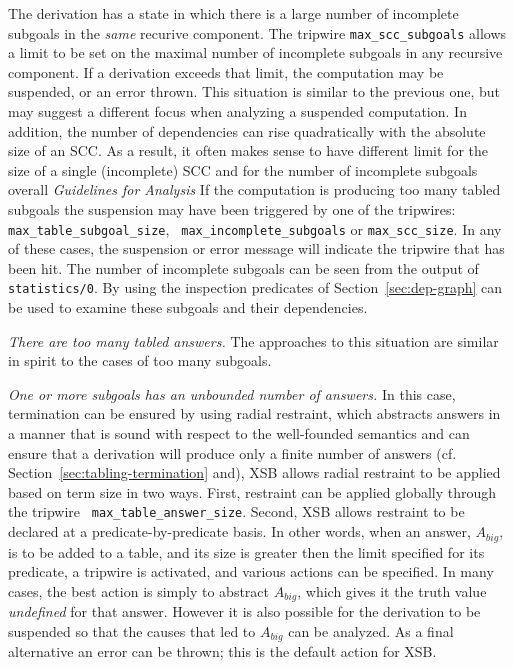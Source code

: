 \item The derivation has a state in which there is a large number of
 incomplete subgoals in the {\em same} recurive component.  The
 tripwire {\tt max\_scc\_subgoals} allows a limit to be set on the
 maximal number of incomplete subgoals in any recursive component.  If
 a derivation exceeds that limit, the computation may be suspended, or
 an error thrown.  This situation is similar to the previous one, but
 may suggest a different focus when analyzing a suspended computation.
  In addition, the number of dependencies can rise quadratically with
 the absolute size of an SCC.  As a result, it often makes sense to
 have different limit for the size of a single (incomplete) SCC and
 for the number of incomplete subgoals overall
%
\ei 
%
{\em Guidelines for Analysis} If the computation is producing too many
 tabled subgoals the suspension may have been triggered by one of the
 tripwires: {\tt max\_table\_subgoal\_size}, {\tt
 max\_incomplete\_subgoals} or {\tt max\_scc\_size}.  In any of these
 cases, the suspension or error message will indicate the tripwire
 that has been hit.  The number of incomplete subgoals can be seen
 from the output of {\tt statistics/0}.  By using the inspection
 predicates of Section~\ref{sec:dep-graph} can be used to examine these
 subgoals and their dependencies.
%
\ei
\ei 

\bi

\item {\em There are too many tabled answers.} The approaches to this
  situation are similar in spirit to the cases of too many subgoals.
%
\bi
\item {\em One or more subgoals has an unbounded number of answers.}
  In this case, termination can be ensured by using radial restraint,
 which abstracts answers in a manner that is sound with respect to the
 well-founded semantics and can ensure that a derivation will produce
 only a finite number of answers
 (cf. Section~\ref{sec:tabling-termination} and\cite{GroS13}), XSB
 allows radial restraint to be applied based on term size in two ways.
  First, restraint can be applied globally through the tripwire {\tt
 max\_table\_answer\_size}.  Second, XSB allows restraint to be
 declared at a predicate-by-predicate basis.  In other words, when an
 answer, $A_{big}$, is to be added to a table, and its size is greater
 then the limit specified for its predicate, a tripwire is activated,
 and various actions can be specified.  In many cases, the best action
 is simply to abstract $A_{big}$, which gives it the truth value {\em
 undefined} for that answer. However it is also possible for the
 derivation to be suspended so that the causes that led to $A_{big}$
 can be analyzed.  As a final alternative an error can be thrown; this
 is the default action for XSB.

